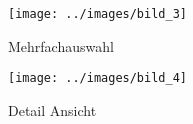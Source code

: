 \begin{wrapfigure}{r}{0.25\textwidth}
\label{Bild3}
\centering
\texttt{[image: ../images/bild\_3]}
\caption{Mehrfachauswahl}
\end{wrapfigure} 


\begin{wrapfigure}{r}{0.3\textwidth}
\label{Bild4}
\begin{center}
\texttt{[image: ../images/bild\_4]}
\end{center}

\caption{Detail Ansicht}
\end{wrapfigure}

